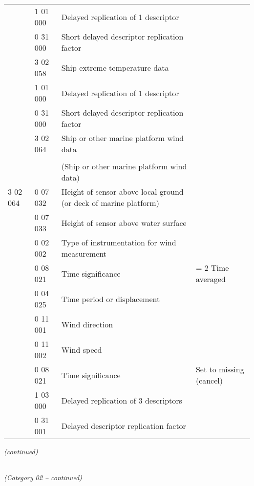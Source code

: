 \begin{longtable}[]{@{}llll@{}}
& 1 01 000 & Delayed replication of 1 descriptor &\tabularnewline
& 0 31 000 & Short delayed descriptor replication factor &\tabularnewline
& 3 02 058 & Ship extreme temperature data &\tabularnewline
& 1 01 000 & Delayed replication of 1 descriptor &\tabularnewline
& 0 31 000 & Short delayed descriptor replication factor &\tabularnewline
& 3 02 064 & Ship or other marine platform wind data &\tabularnewline
& & &\tabularnewline
& & (Ship or other marine platform wind data) &\tabularnewline
3 02 064 & 0 07 032 & Height of sensor above local ground (or deck of marine platform) &\tabularnewline
& 0 07 033 & Height of sensor above water surface &\tabularnewline
& 0 02 002 & Type of instrumentation for wind measurement &\tabularnewline
& 0 08 021 & Time significance & = 2 Time averaged\tabularnewline
& 0 04 025 & Time period or displacement &\tabularnewline
& 0 11 001 & Wind direction &\tabularnewline
& 0 11 002 & Wind speed &\tabularnewline
& 0 08 021 & Time significance & Set to missing (cancel)\tabularnewline
& 1 03 000 & Delayed replication of 3 descriptors &\tabularnewline
& 0 31 001 & Delayed descriptor replication factor &\tabularnewline
\bottomrule
\end{longtable}

\emph{(continued)}

\emph{\\
(Category 02 -- continued)}

